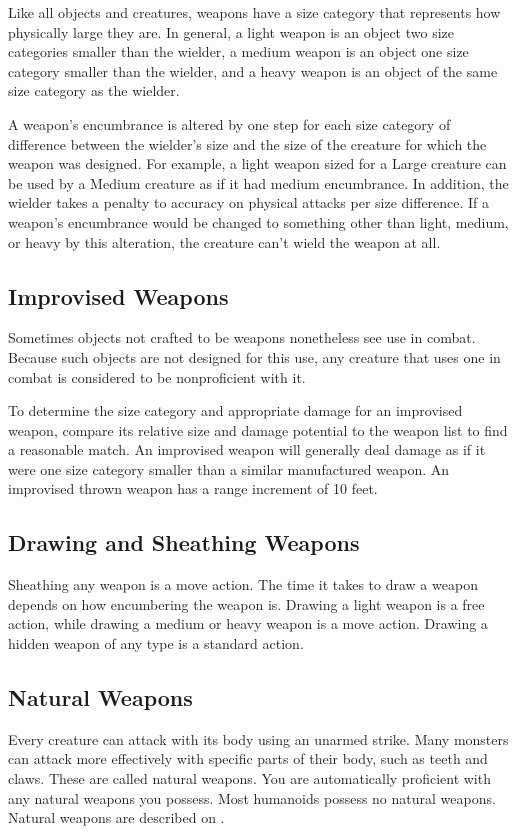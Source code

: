              Like all objects and creatures, weapons have a size category that represents how physically large they are. In general, a light weapon is an object two size categories smaller than the wielder, a medium weapon is an object one size category smaller than the wielder, and a heavy weapon is an object of the same size category as the wielder.

             A weapon's encumbrance is altered by one step for each size category of difference between the wielder's size and the size of the creature for which the weapon was designed. For example, a light weapon sized for a Large creature can be used by a Medium creature as if it had medium encumbrance. In addition, the wielder takes a  penalty to accuracy on physical attacks per size difference. If a weapon's encumbrance would be changed to something other than light, medium, or heavy by this alteration, the creature can't wield the weapon at all.

    \subsection{Improvised Weapons}\label{Improvised Weapons} Sometimes objects not crafted to be weapons nonetheless see use in combat. Because such objects are not designed for this use, any creature that uses one in combat is considered to be nonproficient with it.

        To determine the size category and appropriate damage for an improvised weapon, compare its relative size and damage potential to the weapon list to find a reasonable match. An improvised weapon will generally deal damage as if it were one size category smaller than a similar manufactured weapon. An improvised thrown weapon has a range increment of 10 feet.

    \subsection{Drawing and Sheathing Weapons}\label{Drawing and Sheathing Weapons}
        Sheathing any weapon is a move action. The time it takes to draw a weapon depends on how encumbering the weapon is. Drawing a light weapon is a free action, while drawing a medium or heavy weapon is a move action. Drawing a hidden weapon of any type is a standard action.

    \subsection{Natural Weapons}\label{Natural Weapons}
        Every creature can attack with its body using an unarmed strike. Many monsters can attack more effectively with specific parts of their body, such as teeth and claws. These are called natural weapons. You are automatically proficient with any natural weapons you possess. Most humanoids possess no natural weapons. Natural weapons are described on .

